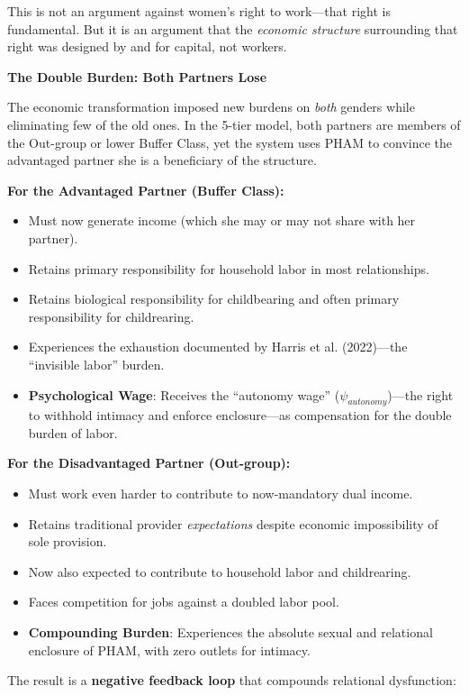 \documentclass[12pt, letterpaper]{article}
\begin{document}
This is not an argument against women's right to work---that right is fundamental. But it is an argument that the \textit{economic structure} surrounding that right was designed by and for capital, not workers.

\textbf{The Double Burden: Both Partners Lose}

The economic transformation imposed new burdens on \textit{both} genders while eliminating few of the old ones. In the 5-tier model, both partners are members of the Out-group or lower Buffer Class, yet the system uses PHAM to convince the advantaged partner she is a beneficiary of the structure.

\textbf{For the Advantaged Partner (Buffer Class):}
\begin{itemize}
    \item Must now generate income (which she may or may not share with her partner).
    \item Retains primary responsibility for household labor in most relationships.
    \item Retains biological responsibility for childbearing and often primary responsibility for childrearing.
    \item Experiences the exhaustion documented by Harris et al. (2022)---the ``invisible labor'' burden.
    \item \textbf{Psychological Wage}: Receives the ``autonomy wage'' ($\psi_{autonomy}$)---the right to withhold intimacy and enforce enclosure---as compensation for the double burden of labor.
\end{itemize}

\textbf{For the Disadvantaged Partner (Out-group):}
\begin{itemize}
    \item Must work even harder to contribute to now-mandatory dual income.
    \item Retains traditional provider \textit{expectations} despite economic impossibility of sole provision.
    \item Now also expected to contribute to household labor and childrearing.
    \item Faces competition for jobs against a doubled labor pool.
    \item \textbf{Compounding Burden}: Experiences the absolute sexual and relational enclosure of PHAM, with zero outlets for intimacy.
\end{itemize}

The result is a \textbf{negative feedback loop} that compounds relational dysfunction:
\end{document}
